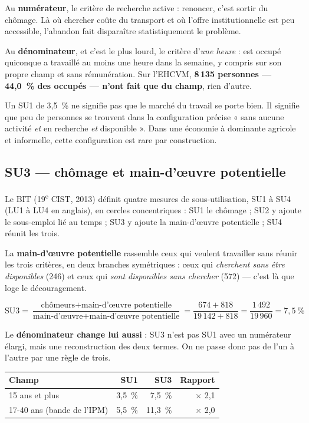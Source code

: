 \documentclass[11pt,a4paper]{article}
\begin{document}
Au \textbf{numérateur}, le critère de recherche active : renoncer, c'est sortir du chômage. Là où
chercher coûte du transport et où l'offre institutionnelle est peu accessible, l'abandon fait
disparaître statistiquement le problème.

Au \textbf{dénominateur}, et c'est le plus lourd, le critère d'\emph{une heure} : est occupé
quiconque a travaillé au moins une heure dans la semaine, y compris sur son propre champ et sans
rémunération. Sur l'EHCVM, \textbf{8\,135 personnes --- 44,0~\% des occupés --- n'ont fait que du
champ}, rien d'autre.

\begin{retenir}
Un SU1 de 3,5~\% ne signifie pas que le marché du travail se porte bien. Il signifie que peu de
personnes se trouvent dans la configuration précise « sans aucune activité \emph{et} en recherche
\emph{et} disponible ». Dans une économie à dominante agricole et informelle, cette configuration
est rare par construction.
\end{retenir}

\subsection{SU3 --- chômage et main-d'\oe uvre potentielle}

Le BIT (19\textsuperscript{e} CIST, 2013) définit quatre mesures de sous-utilisation, SU1 à SU4
(LU1 à LU4 en anglais), en cercles concentriques : SU1 le chômage ; SU2 y ajoute le sous-emploi
lié au temps ; SU3 y ajoute la main-d'\oe uvre potentielle ; SU4 réunit les trois.

La \textbf{main-d'\oe uvre potentielle} rassemble ceux qui veulent travailler sans réunir les trois
critères, en deux branches symétriques : ceux qui \emph{cherchent sans être disponibles} (246) et
ceux qui \emph{sont disponibles sans chercher} (572) --- c'est là que loge le découragement.

\[ \mathrm{SU3} = \frac{\text{chômeurs} + \text{main-d'\oe uvre potentielle}}
                       {\text{main-d'\oe uvre} + \text{main-d'\oe uvre potentielle}}
   = \frac{674 + 818}{19\,142 + 818} = \frac{1\,492}{19\,960} = 7{,}5~\% \]

Le \textbf{dénominateur change lui aussi} : SU3 n'est pas SU1 avec un numérateur élargi, mais une
reconstruction des deux termes. On ne passe donc pas de l'un à l'autre par une règle de trois.

\begin{center}
\small
\begin{tabular}{@{}lrrr@{}}
\toprule
\textbf{Champ} & \textbf{SU1} & \textbf{SU3} & \textbf{Rapport} \\
\midrule
15 ans et plus & 3,5~\% & 7,5~\% & $\times$ 2,1 \\
17-40 ans (bande de l'IPM) & 5,5~\% & 11,3~\% & $\times$ 2,0 \\
\bottomrule
\end{tabular}
\end{center}
\end{document}
